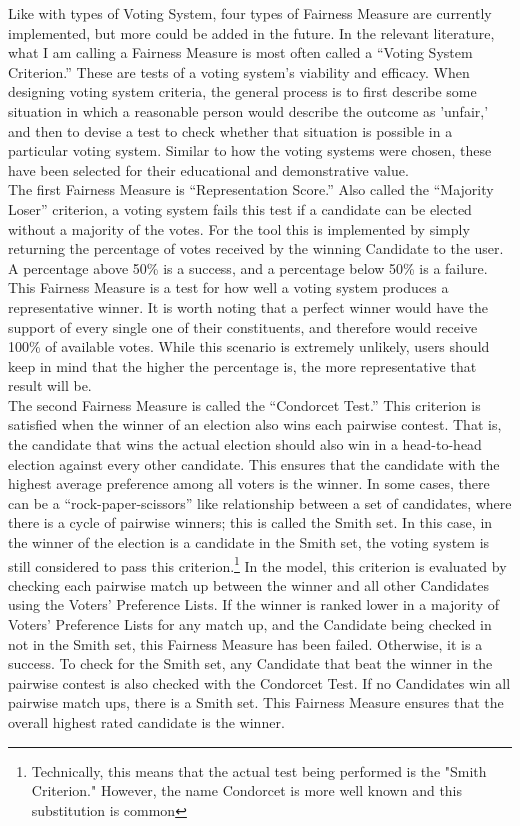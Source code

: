 \documentclass[12pt]{article}
\begin{document}
\qquad Like with types of Voting System, four types of Fairness Measure are currently implemented, but more could be added in the future. In the relevant literature, what I am calling a Fairness Measure is most often called a ``Voting System Criterion.'' These are tests of a voting system's viability and efficacy. When designing voting system criteria, the general process is to first describe some situation in which a reasonable person would describe the outcome as 'unfair,' and then to devise a test to check whether that situation is possible in a particular voting system. Similar to how the voting systems were chosen, these have been selected for their educational and demonstrative value. \\

\qquad The first Fairness Measure is ``Representation Score.'' Also called the ``Majority Loser'' criterion, a voting system fails this test if a candidate can be elected without a majority of the votes. For the tool this is implemented by simply returning the percentage of votes received by the winning Candidate to the user. A percentage above 50\% is a success, and a percentage below 50\% is a failure. This Fairness Measure is a test for how well a voting system produces a representative winner. It is worth noting that a perfect winner would have the support of every single one of their constituents, and therefore would receive 100\% of available votes. While this scenario is extremely unlikely, users should keep in mind that the higher the percentage is, the more representative that result will be. \\

\qquad The second Fairness Measure is called the ``Condorcet Test.'' This criterion is satisfied when the winner of an election also wins each pairwise contest. That is, the candidate that wins the actual election should also win in a head-to-head election against every other candidate. This ensures that the candidate with the highest average preference among all voters is the winner. In some cases, there can be a ``rock-paper-scissors'' like relationship between a set of candidates, where there is a cycle of pairwise winners; this is called the Smith set. In this case, in the winner of the election is a candidate in the Smith set, the voting system is still considered to pass this criterion.\footnote{Technically, this means that the actual test being performed is the "Smith Criterion." However, the name Condorcet is more well known and this substitution is common} In the model, this criterion is evaluated by checking each pairwise match up between the winner and all other Candidates using the Voters' Preference Lists. If the winner is ranked lower in a majority of Voters' Preference Lists for any match up, and the Candidate being checked in not in the Smith set, this Fairness Measure has been failed. Otherwise, it is a success. To check for the Smith set, any Candidate that beat the winner in the pairwise contest is also checked with the Condorcet Test. If no Candidates win all pairwise match ups, there is a Smith set. This Fairness Measure ensures that the overall highest rated candidate is the winner. \\
\end{document}
